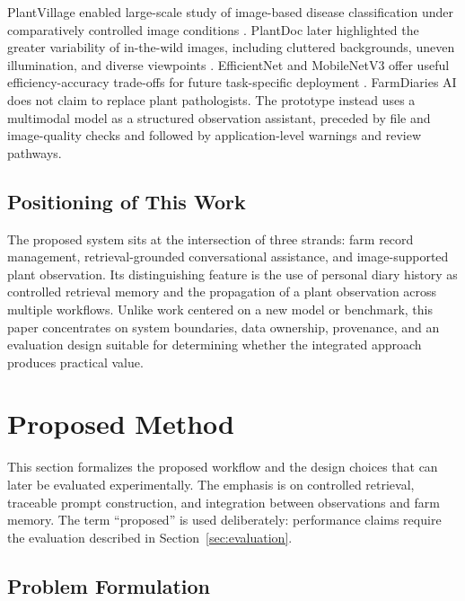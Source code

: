 \documentclass[conference]{IEEEtran}
\begin{document}
PlantVillage enabled large-scale study of image-based disease classification under comparatively controlled image conditions \cite{hughes2015,mohanty2016}. PlantDoc later highlighted the greater variability of in-the-wild images, including cluttered backgrounds, uneven illumination, and diverse viewpoints \cite{singh2020}. EfficientNet and MobileNetV3 offer useful efficiency-accuracy trade-offs for future task-specific deployment \cite{tan2019,howard2019}. FarmDiaries AI does not claim to replace plant pathologists. The prototype instead uses a multimodal model as a structured observation assistant, preceded by file and image-quality checks and followed by application-level warnings and review pathways.

\subsection{Positioning of This Work}

The proposed system sits at the intersection of three strands: farm record management, retrieval-grounded conversational assistance, and image-supported plant observation. Its distinguishing feature is the use of personal diary history as controlled retrieval memory and the propagation of a plant observation across multiple workflows. Unlike work centered on a new model or benchmark, this paper concentrates on system boundaries, data ownership, provenance, and an evaluation design suitable for determining whether the integrated approach produces practical value.

\section{Proposed Method}

This section formalizes the proposed workflow and the design choices that can later be evaluated experimentally. The emphasis is on controlled retrieval, traceable prompt construction, and integration between observations and farm memory. The term ``proposed'' is used deliberately: performance claims require the evaluation described in Section~\ref{sec:evaluation}.

\subsection{Problem Formulation}
\end{document}
